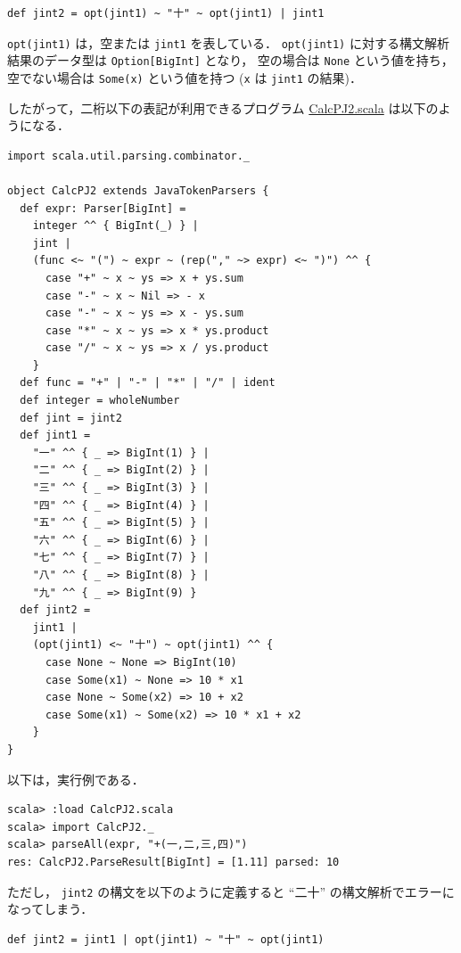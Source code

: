 \documentclass[a4j]{jsarticle}
\begin{document}
\begin{verbatim}
def jint2 = opt(jint1) ~ "十" ~ opt(jint1) | jint1
\end{verbatim}

\texttt{opt(jint1)} は，空または \texttt{jint1} を表している．
\texttt{opt(jint1)} に対する構文解析結果のデータ型は \texttt{Option[BigInt]} となり，
空の場合は \texttt{None} という値を持ち，
空でない場合は \texttt{Some(x)} という値を持つ (\texttt{x} は \texttt{jint1} の結果)．

したがって，二桁以下の表記が利用できるプログラム \href{file:///home/tamura/lect2/ProLang/2018/org/prog/parser/CalcPJ2.scala}{CalcPJ2.scala} は以下のようになる．


\begin{verbatim}
import scala.util.parsing.combinator._

object CalcPJ2 extends JavaTokenParsers {
  def expr: Parser[BigInt] =
    integer ^^ { BigInt(_) } |
    jint |
    (func <~ "(") ~ expr ~ (rep("," ~> expr) <~ ")") ^^ {
      case "+" ~ x ~ ys => x + ys.sum
      case "-" ~ x ~ Nil => - x
      case "-" ~ x ~ ys => x - ys.sum
      case "*" ~ x ~ ys => x * ys.product
      case "/" ~ x ~ ys => x / ys.product
    }
  def func = "+" | "-" | "*" | "/" | ident
  def integer = wholeNumber
  def jint = jint2
  def jint1 =
    "一" ^^ { _ => BigInt(1) } |
    "二" ^^ { _ => BigInt(2) } |
    "三" ^^ { _ => BigInt(3) } |
    "四" ^^ { _ => BigInt(4) } |
    "五" ^^ { _ => BigInt(5) } |
    "六" ^^ { _ => BigInt(6) } |
    "七" ^^ { _ => BigInt(7) } |
    "八" ^^ { _ => BigInt(8) } |
    "九" ^^ { _ => BigInt(9) }
  def jint2 =
    jint1 |
    (opt(jint1) <~ "十") ~ opt(jint1) ^^ {
      case None ~ None => BigInt(10)
      case Some(x1) ~ None => 10 * x1
      case None ~ Some(x2) => 10 + x2
      case Some(x1) ~ Some(x2) => 10 * x1 + x2
    }
}
\end{verbatim}

以下は，実行例である．

\begin{verbatim}
scala> :load CalcPJ2.scala
scala> import CalcPJ2._
scala> parseAll(expr, "+(一,二,三,四)")
res: CalcPJ2.ParseResult[BigInt] = [1.11] parsed: 10
\end{verbatim}

ただし， \texttt{jint2} の構文を以下のように定義すると ``二十'' の構文解析でエラーになってしまう．

\begin{verbatim}
def jint2 = jint1 | opt(jint1) ~ "十" ~ opt(jint1)
\end{verbatim}
\end{document}
